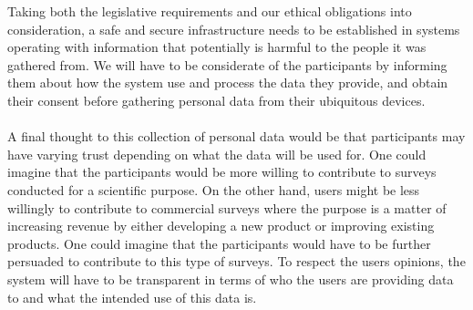 Taking both the legislative requirements and our ethical obligations into consideration, a safe and secure infrastructure needs to be established in systems operating with information that potentially is harmful to the people it was gathered from. We will have to be considerate of the participants by informing them about how the system use and process the data they provide, and obtain their consent before gathering personal data from their ubiquitous devices.
\\\\
A final thought to this collection of personal data would be that participants may have varying trust depending on what the data will be used for. One could imagine that the participants would be more willing to contribute to surveys conducted for a scientific purpose. On the other hand, users might be less willingly to contribute to commercial surveys where the purpose is a matter of increasing revenue by either developing a new product or improving existing products. One could imagine that the participants would have to be further persuaded to contribute to this type of surveys. To respect the users opinions, the system will have to be transparent in terms of who the users are providing data to and what the intended use of this data is.